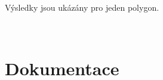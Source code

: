 \documentclass[oneside,12pt,a4paper]{book}
\begin{document}
Výsledky jsou ukázány pro jeden polygon.\par
\\ 
\pagebreak








\clearpage
\chapter{Dokumentace} 
\end{document}
